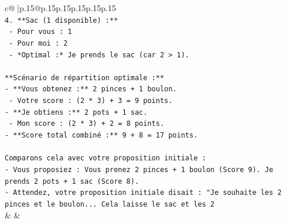 \documentclass{article}
\begin{document}
{\begin{supertabular}{c@{$\;$}|p{.15\linewidth}@{}p{.15\linewidth}p{.15\linewidth}p{.15\linewidth}p{.15\linewidth}p{.15\linewidth}}
{{{\\ 
\texttt{4.  **Sac (1 disponible) :**} \\
\texttt{    {-} Pour vous : 1} \\
\texttt{    {-} Pour moi : 2} \\
\texttt{    {-} *Optimal :* Je prends le sac (car 2 > 1).} \\
\\ 
\texttt{**Scénario de répartition optimale :**} \\
\texttt{{-} **Vous obtenez :** 2 pinces + 1 boulon.} \\
\texttt{  {-} Votre score : (2 * 3) + 3 = 9 points.} \\
\texttt{{-} **Je obtiens :** 2 pots + 1 sac.} \\
\texttt{  {-} Mon score : (2 * 3) + 2 = 8 points.} \\
\texttt{{-} **Score total combiné :** 9 + 8 = 17 points.} \\
\\ 
\texttt{Comparons cela avec votre proposition initiale :} \\
\texttt{{-} Vous proposiez : Vous prenez 2 pinces + 1 boulon (Score 9). Je prends 2 pots + 1 sac (Score 8).} \\
\texttt{{-} Attendez, votre proposition initiale disait : "Je souhaite les 2 pinces et le boulon... Cela laisse le sac et les 2} \\
            }
        }
    }
    & & \\ \\


\end{supertabular}}
\end{document}
